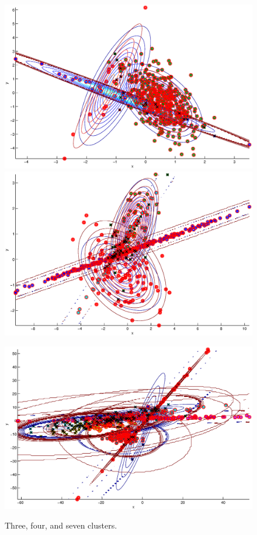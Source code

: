 \documentclass[11pt]{report}
\begin{document}
\begin{figure}[h]
  \centering
  \includegraphics[width=.8\textwidth,angle=90]{nclusters3.eps}
  \includegraphics[width=.8\textwidth,angle=90]{nclusters4.eps}
  \vspace{-2em}
  \caption{Three, four, and seven clusters.}

  \includegraphics[width=\textwidth]{nclusters7.eps}
  \label{nclusters}
\end{figure}





\end{document}
